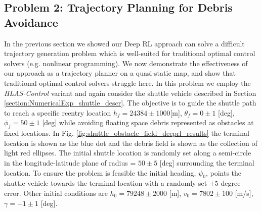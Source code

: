 \documentclass{UnderReview}
\begin{document}
\subsection{Problem 2: Trajectory Planning for Debris Avoidance}\label{section:DebrisAvoidance}
In the previous section we showed our Deep RL approach can solve a difficult trajectory generation problem which is well-suited for traditional optimal control solvers (e.g. nonlinear programming).  We now demonstrate the effectiveness of our approach as a trajectory planner on a quasi-static map, and show that traditional optimal control solvers struggle here.  In this problem we employ the \textit{HLAS-Control} variant and again consider the shuttle vehicle described in Section \ref{section:NumericalExp_shuttle_descr}.  The objective is to guide the shuttle path to reach a specific reentry location $h_f=24384\pm1000$[m], $\theta_f=0\pm 1$ [deg], $\phi_f=50\pm 1$ [deg] while avoiding floating space debris represented as obstacles at fixed locations.  In Fig. \ref{fig:shuttle_obstacle_field_deeprl_results} the terminal location is shown as the blue dot and the debris field is shown as the collection of light red ellipses.  
The initial shuttle location is randomly set along a semi-circle in the longitude-latitude plane of radius = $50 \pm 5$ [deg] surrounding the terminal location.  To ensure the problem is feasible the initial heading, $\psi_0$, points the shuttle vehicle towards the terminal location with a randomly set $\pm 5$ degree error.  Other initial conditions are $h_0=79248 \pm 2000$ [m], $v_0=7802 \pm 100$ [m/s], $\gamma=-1\pm 1$ [deg].  
\end{document}
